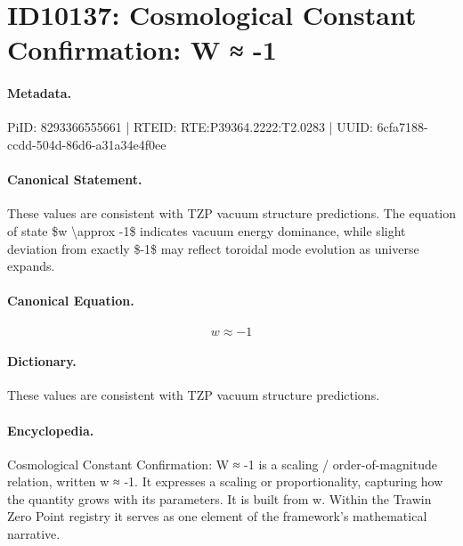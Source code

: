 \section*{ID10137: Cosmological Constant Confirmation: W ≈ -1}
\paragraph{Metadata.}
PiID: 8293366555661 | RTEID: RTE:P39364.2222:T2.0283 | UUID: 6cfa7188-ccdd-504d-86d6-a31a34e4f0ee

\paragraph{Canonical Statement.}
These values are consistent with TZP vacuum structure predictions. The equation of state \$w \textbackslash{}approx -1\$ indicates vacuum energy dominance, while slight deviation from exactly \$-1\$ may reflect toroidal mode evolution as universe expands.

\paragraph{Canonical Equation.}
\[
w \approx -1
\]

\paragraph{Dictionary.}
These values are consistent with TZP vacuum structure predictions.

\paragraph{Encyclopedia.}
Cosmological Constant Confirmation: W ≈ -1 is a scaling / order-of-magnitude relation, written w ≈ -1. It expresses a scaling or proportionality, capturing how the quantity grows with its parameters. It is built from w. Within the Trawin Zero Point registry it serves as one element of the framework's mathematical narrative.
